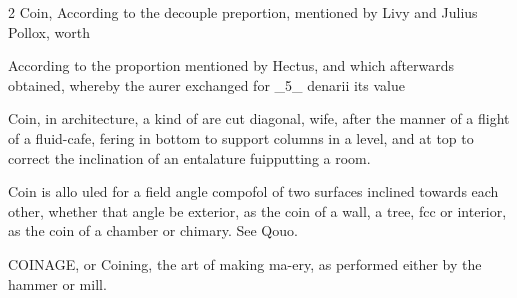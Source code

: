 \documentclass[10pt]{article}
\begin{document}
\begin{multicols}{2}\raggedcolumns
Coin, According to the decouple preportion, mentioned by Livy and Julius Pollox, worth

According to the proportion mentioned by Hectus, and which afterwards obtained, whereby the aurer exchanged for \_5\_ denarii its value

Coin, in architecture, a kind of are cut diagonal, wife, after the manner of a flight of a fluid-cafe, fering in bottom to support columns in a level, and at top to correct the inclination of an entalature fuipputting a room.

Coin is allo uled for a field angle compofol of two surfaces inclined towards each other, whether that angle be exterior, as the coin of a wall, a tree, fcc or interior, as the coin of a chamber or chimary. See Qouo.

COINAGE, or Coining, the art of making ma-ery, as performed either by the hammer or mill.


\end{multicols}
\end{document}
